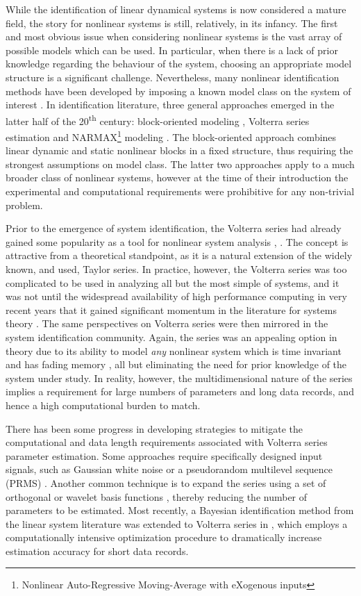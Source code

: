 While the identification of linear dynamical systems is now considered a mature field, the story for nonlinear systems is still, relatively, in its infancy. The first and most obvious issue when considering nonlinear systems is the vast array of possible models which can be used. In particular, when there is a lack of prior knowledge regarding the behaviour of the system, choosing an appropriate model structure is a significant challenge. Nevertheless, many nonlinear identification methods have been developed by imposing a known model class on the system of interest \cite{Billings1980}. In identification literature, three general approaches emerged in the latter half of the 20\textsuperscript{th} century: block-oriented modeling \cite{Billings1982}, Volterra series estimation \cite{Schetzen1965} and NARMAX\footnote{Nonlinear Auto-Regressive Moving-Average with eXogenous inputs} modeling \cite{Leontaritis1985}. The block-oriented approach combines linear dynamic and static nonlinear blocks in a fixed structure, thus requiring the strongest assumptions on model class. The latter two approaches apply to a much broader class of nonlinear systems, however at the time of their introduction the experimental and computational requirements were prohibitive for any non-trivial problem.     

Prior to the emergence of system identification, the Volterra series had already gained some popularity as a tool for nonlinear system analysis \cite{Wiener1942}, \cite{Ikehara1951}. The concept is attractive from a theoretical standpoint, as it is a natural extension of the widely known, and used, Taylor series. In practice, however, the Volterra series was too complicated to be used in analyzing all but the most simple of systems, and it was not until the widespread availability of high performance computing in very recent years that it gained significant momentum in the literature for systems theory \cite{Cheng2017}. The same perspectives on Volterra series were then mirrored in the system identification community. Again, the series was an appealing option in theory due to its ability to model \emph{any} nonlinear system which is time invariant and has fading memory \cite{Boyd1985}, all but eliminating the need for prior knowledge of the system under study.  In reality, however, the multidimensional nature of the series implies a requirement for large numbers of parameters and long data records, and hence a high computational burden to match.

There has been some progress in developing strategies to mitigate the computational and data length requirements associated with Volterra series parameter estimation. Some approaches require specifically designed input signals, such as Gaussian white noise \cite{Schetzen1974} or a pseudorandom multilevel sequence (PRMS) \cite{Nowak1994}. Another common technique is to expand the series using a set of orthogonal or wavelet basis functions \cite{Cheng2017}, thereby reducing the number of parameters to be estimated. Most recently, a Bayesian identification method from the linear system literature was extended to Volterra series in \cite{Birpoutsoukis2017}, which employs a computationally intensive optimization procedure to dramatically increase estimation accuracy for short data records. 

